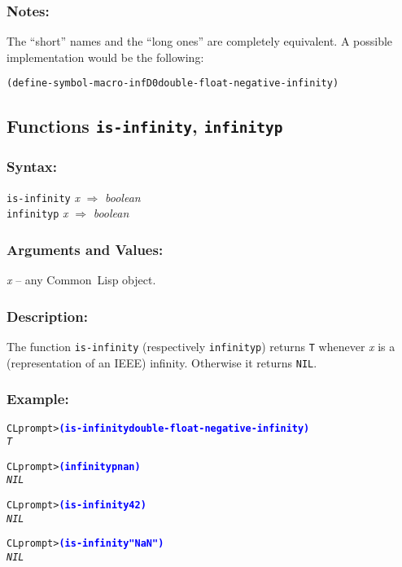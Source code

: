 \documentclass[fleqn]{article}
\newcommand{\CL}{\textsf{Common~Lisp}}
\newcommand{\code}[1]{\texttt{#1}}
\newcommand{\varname}[1]{\textit{#1}}
\newcommand{\codeprompt}[1]{\textcolor{blue}{\textbf{#1}}}
\newcommand{\DDictionaryItem}[1]{\vspace*{6pt}\noindent\hrulefill\vspace*{-9pt}\subsection*{#1}}
\begin{document}
\subsubsection*{Notes:}

The ``short'' names and the ``long ones'' are completely equivalent.
A possible implementation would be the following:
\begin{alltt}
(define-symbol-macro -infD0 double-float-negative-infinity)
\end{alltt}


\DDictionaryItem{Functions \code{is-infinity}, \code{infinityp}}

\subsubsection*{Syntax:}

\code{is-infinity} \varname{x} $\Rightarrow$ \textit{boolean}\\
\code{infinityp} \varname{x} $\Rightarrow$ \textit{boolean}

\subsubsection*{Arguments and Values:}

\varname{x} -- any \CL{} object.

\subsubsection*{Description:}

The function \code{is-infinity} (respectively \code{infinityp}) returns \code{T}
whenever \varname{x} is a (representation of an IEEE) infinity.  Otherwise
it returns \code{NIL}.


\subsubsection*{Example:}

\begin{alltt}
CL prompt> \codeprompt{(is-infinity double-float-negative-infinity)}
\textit{T}

CL prompt> \codeprompt{(infinityp nan)}
\textit{NIL}

CL prompt> \codeprompt{(is-infinity 42)}
\textit{NIL}

CL prompt> \codeprompt{(is-infinity "NaN")}
\textit{NIL}
\end{alltt}
\end{document}
